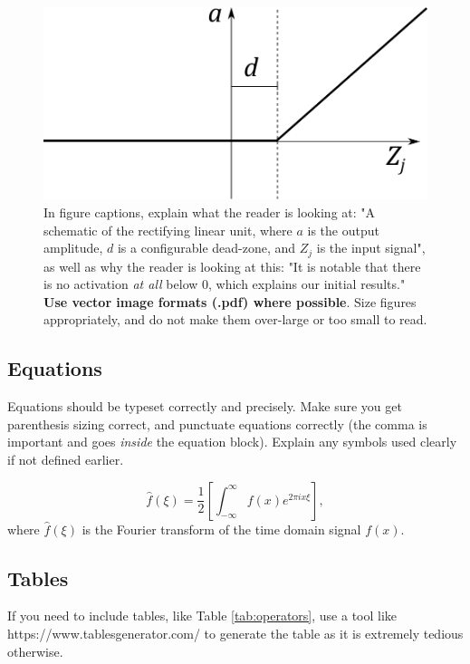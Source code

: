 \documentclass{l4proj}
\begin{document}
\begin{figure}
    \centering
    \includegraphics[width=0.5\linewidth]{images/relu.pdf}    

    \caption{In figure captions, explain what the reader is looking at: "A schematic of the rectifying linear unit, where $a$ is the output amplitude,
    $d$ is a configurable dead-zone, and $Z_j$ is the input signal", as well as why the reader is looking at this: 
    "It is notable that there is no activation \emph{at all} below 0, which explains our initial results." 
    \textbf{Use vector image formats (.pdf) where possible}. Size figures appropriately, and do not make them over-large or too small to read.
    }

    \label{fig:relu} 
\end{figure}

\subsection{Equations}

Equations should be typeset correctly and precisely. Make sure you get parenthesis sizing correct, and punctuate equations correctly 
(the comma is important and goes \textit{inside} the equation block). Explain any symbols used clearly if not defined earlier. 

\begin{equation}
    \hat{f}(\xi) = \frac{1}{2}\left[ \int_{-\infty}^{\infty} f(x) e^{2\pi i x \xi} \right],
\end{equation}    
where $\hat{f}(\xi)$ is the Fourier transform of the time domain signal $f(x)$.

\subsection{Tables}

If you need to include tables, like Table \ref{tab:operators}, use a tool like https://www.tablesgenerator.com/ to generate the table as it is
extremely tedious otherwise. 
\end{document}
